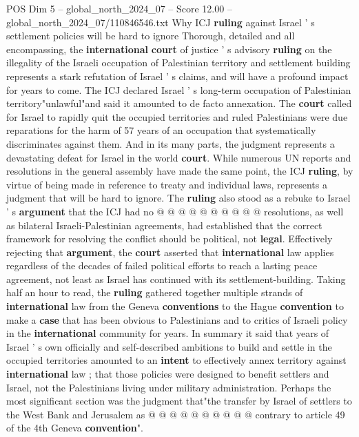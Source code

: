 \begin{textsample}{POS Dim 5 – global\_north\_2024\_07 – Score 12.00 – global\_north\_2024\_07/110846546.txt}  \label{ex:f5_pos_310}
Why ICJ \textbf{ruling} against Israel ' s settlement policies will be hard to ignore Thorough, detailed and all encompassing, the \textbf{international} \textbf{court} of justice ' s advisory \textbf{ruling} on the illegality of the Israeli occupation of Palestinian territory and settlement building represents a stark refutation of Israel ' s claims, and will have a profound impact for years to come.
The ICJ declared Israel ' s long-term occupation of Palestinian territory"unlawful"and said it amounted to de facto annexation.
The \textbf{court} called for Israel to rapidly quit the occupied territories and ruled Palestinians were due reparations for the harm of 57 years of an occupation that systematically discriminates against them.
And in its many parts, the judgment represents a devastating defeat for Israel in the world \textbf{court}.
While numerous UN reports and resolutions in the general assembly have made the same point, the ICJ \textbf{ruling}, by virtue of being made in reference to treaty and individual laws, represents a judgment that will be hard to ignore.
The \textbf{ruling} also stood as a rebuke to Israel ' s \textbf{argument} that the ICJ had no @ @ @ @ @ @ @ @ @ @ resolutions, as well as bilateral Israeli-Palestinian agreements, had established that the correct framework for resolving the conflict should be political, not \textbf{legal}.
Effectively rejecting that \textbf{argument}, the \textbf{court} asserted that \textbf{international} law applies regardless of the decades of failed political efforts to reach a lasting peace agreement, not least as Israel has continued with its settlement-building.
Taking half an hour to read, the \textbf{ruling} gathered together multiple strands of \textbf{international} law from the Geneva \textbf{conventions} to the Hague \textbf{convention} to make a \textbf{case} that has been obvious to Palestinians and to critics of Israeli policy in the \textbf{international} community for years.
In summary it said that years of Israel ' s own officially and self-described ambitions to build and settle in the occupied territories amounted to an \textbf{intent} to effectively annex territory against \textbf{international} law ; that those policies were designed to benefit settlers and Israel, not the Palestinians living under military administration.
Perhaps the most significant section was the judgment that"the transfer by Israel of settlers to the West Bank and Jerusalem as @ @ @ @ @ @ @ @ @ @ contrary to article 49 of the 4th Geneva \textbf{convention}".

\end{textsample}
